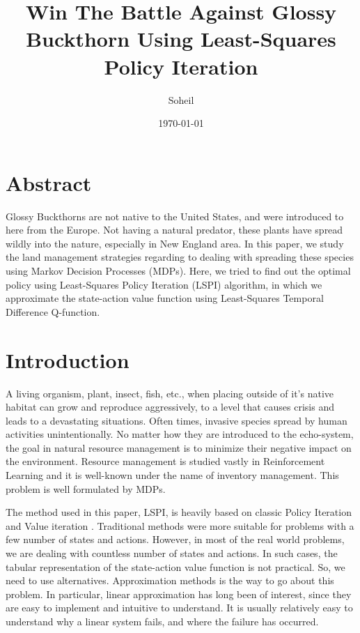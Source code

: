 \documentclass{article}
\title{Win The Battle Against Glossy Buckthorn Using Least-Squares Policy Iteration}
\author{Soheil}
\date{\today}
\theoremstyle{remark}
\begin{document}
\maketitle
\section{Abstract}
Glossy Buckthorns are not native to the United States, and were introduced to here from the Europe. Not having a natural predator, these plants have spread wildly into the nature, especially in New England area. In this paper, we study the land management strategies regarding to dealing with spreading these species using Markov Decision Processes (MDPs). Here, we tried to find out the optimal policy using Least-Squares Policy Iteration (LSPI) algorithm, in which we approximate the state-action value function using Least-Squares Temporal Difference Q-function.

\section{Introduction} \label{introduction}
A living organism, plant, insect, fish, etc., when placing outside of it's native habitat can grow and reproduce aggressively, to a level that causes crisis and leads to a devastating situations. Often times, invasive species spread by human activities unintentionally. No matter how they are introduced to the echo-system, the goal in natural resource management is to minimize their negative impact on the environment. Resource management is studied vastly in Reinforcement Learning and it is well-known under the name of inventory management. This problem is well formulated by MDPs. 


The method used in this paper, LSPI\cite{Lagoudakis2004}, is heavily based on classic Policy Iteration and Value iteration \cite{Sutton:1998}. Traditional methods were more suitable for problems with a few number of states and actions. However, in most of the real world problems, we are dealing with countless number of states and actions. In such cases, the tabular representation of the state-action value function is not practical. So, we need to use alternatives. Approximation methods is the way to go about this problem. In particular, linear approximation has long been of interest, since they are easy to implement and intuitive to understand. It is usually relatively easy to understand why a linear system fails, and where the failure has occurred.
\end{document}
